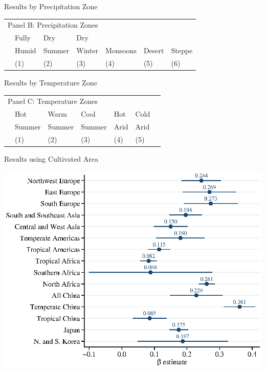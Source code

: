 \documentclass[10pt, xcolor=dvipsnames]{beamer}
\begin{document}
\begin{frame}{Results by Precipitation Zone}

{\scriptsize
\begin{tabularx}{\textwidth}{lXXXXXX}
\midrule
\multicolumn{7}{l}{Panel B: Precipitation Zones} \\
& Fully     & Dry         & Dry        &              &            & \\
& Humid & Summer  & Winter & Monsoons & Desert & Steppe   \\
 & (1) & (2) & (3) & (4) & (5) & (6) \\
\midrule

\midrule
\end{tabularx}
}

\end{frame}

\begin{frame}{Results by Temperature Zone}

{\scriptsize
\begin{tabularx}{\textwidth}{lXXXXXX}
\midrule
\multicolumn{7}{l}{Panel C: Temperature Zones} \\
    & Hot        & Warm        & Cool       & Hot      & Cold     &  \\
    & Summer & Summer  & Summer & Arid & Arid &   \\
 & (1) & (2) & (3) & (4) & (5) &  \\    
\midrule

\midrule
\end{tabularx}
}

\hfill \hyperlink{climate}{}
\end{frame}


\begin{frame}{Results using Cultivated Area}\label{cultreg}
\begin{center}
\includegraphics[width=.8\textwidth]{fig_coef_subregion_cult.eps}
\end{center}
\hfill \hyperlink{cult}{}
\end{frame}
\end{document}
